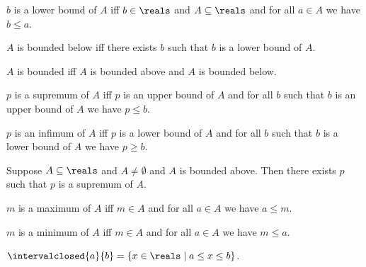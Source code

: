 \begin{definition}\label{real_lower_bound}
    $b$ is a lower bound of $A$ iff $b\in\reals$ and $A\subseteq\reals$ and for all $a\in A$ we have $b \leq a$.
\end{definition}

\begin{definition}\label{real_bounded_below}
    $A$ is bounded below iff there exists $b$ such that $b$ is a lower bound of $A$.
\end{definition}

\begin{definition}\label{real_bounded}
    $A$ is bounded iff $A$ is bounded above and $A$ is bounded below.
\end{definition}

\begin{definition}\label{real_supremum}
    $p$ is a supremum of $A$ iff $p$ is an upper bound of $A$ and for all $b$ such that $b$ is an upper bound of $A$ we have $p \leq b$.
\end{definition}

\begin{definition}\label{real_infimum}
    $p$ is an infimum of $A$ iff $p$ is a lower bound of $A$ and for all $b$ such that $b$ is a lower bound of $A$ we have $p \geq b$.
\end{definition}

\begin{axiom}\label{real_completeness_axiom}
    Suppose $A\subseteq\reals$ and $A\neq \emptyset$ and $A$ is bounded above.
    Then there exists $p$ such that $p$ is a supremum of $A$.
\end{axiom}

\begin{definition}\label{real_maximum}
    $m$ is a maximum of $A$ iff $m\in A$ and for all $a\in A$ we have $a \leq m$.
\end{definition}

\begin{definition}\label{real_minimum}
    $m$ is a minimum of $A$ iff $m\in A$ and for all $a\in A$ we have $m \leq a$.
\end{definition}

\begin{definition}\label{intervalclosed}
    $\intervalclosed{a}{b} = \{x \in \reals \mid a \leq x \leq b\}$.
\end{definition}

